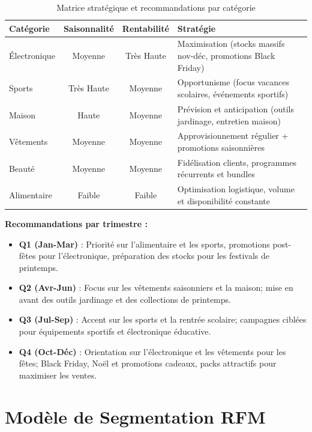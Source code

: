 \documentclass[a4paper,12pt]{article}
\begin{document}
\begin{table}[H]
\centering
\caption{Matrice stratégique et recommandations par catégorie}
\label{tab:strategie_categorie}
\begin{tabular}{|l|c|c|l|}
\hline
\textbf{Catégorie} & \textbf{Saisonnalité} & \textbf{Rentabilité} & \textbf{Stratégie} \\ \hline
Électronique & Moyenne & Très Haute & Maximisation (stocks massifs nov-déc, promotions Black Friday) \\ \hline
Sports & Très Haute & Moyenne & Opportunisme (focus vacances scolaires, événements sportifs) \\ \hline
Maison & Haute & Moyenne & Prévision et anticipation (outils jardinage, entretien maison) \\ \hline
Vêtements & Moyenne & Moyenne & Approvisionnement régulier + promotions saisonnières \\ \hline
Beauté & Moyenne & Moyenne & Fidélisation clients, programmes récurrents et bundles \\ \hline
Alimentaire & Faible & Faible & Optimisation logistique, volume et disponibilité constante \\ \hline
\end{tabular}
\end{table}

\textbf{Recommandations par trimestre :}  
\begin{itemize}
    \item \textbf{Q1 (Jan-Mar)} : Priorité sur l’alimentaire et les sports, promotions post-fêtes pour l’électronique, préparation des stocks pour les festivals de printemps.  
    \item \textbf{Q2 (Avr-Jun)} : Focus sur les vêtements saisonniers et la maison; mise en avant des outils jardinage et des collections de printemps.  
    \item \textbf{Q3 (Jul-Sep)} : Accent sur les sports et la rentrée scolaire; campagnes ciblées pour équipements sportifs et électronique éducative.  
    \item \textbf{Q4 (Oct-Déc)} : Orientation sur l’électronique et les vêtements pour les fêtes; Black Friday, Noël et promotions cadeaux, packs attractifs pour maximiser les ventes.
\end{itemize}


\chapter{Modèle de Segmentation RFM}
\end{document}
